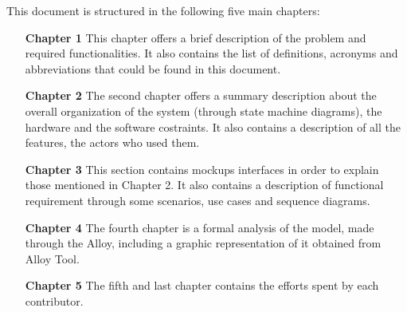 This document is structured in the following five main chapters:

\begin{enumerate}
    \item[\textbf{Chapter 1}] This chapter offers a brief description of the problem and required functionalities. It also
    contains the list of definitions, acronyms and abbreviations that could be found in this document. 

    \item[\textbf{Chapter 2}] The second chapter offers a summary description about the overall organization of the system 
    (through state machine diagrams), the hardware and the software costraints. 
    It also contains a description of all the features, the actors who used them.

    \item[\textbf{Chapter 3}] This section contains mockups interfaces in order to explain those mentioned in Chapter 2.
    It also contains a description of functional requirement through some scenarios, use cases and sequence diagrams. 

    \item[\textbf{Chapter 4}] The fourth chapter is a formal analysis of the model, made through the Alloy, including a graphic representation of it obtained from Alloy Tool.

    \item[\textbf{Chapter 5}] The fifth and last chapter contains the efforts spent by each contributor.
\end{enumerate}
